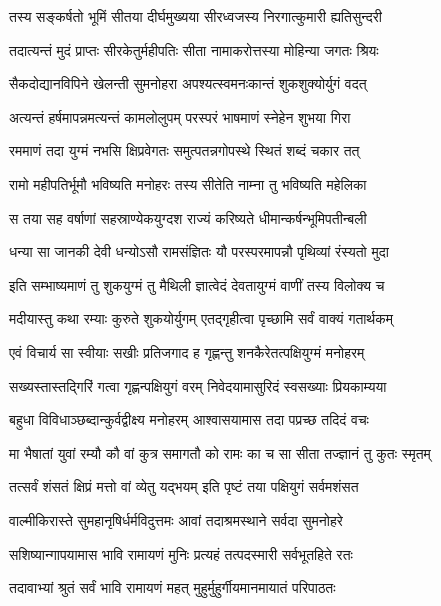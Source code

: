 \twolineshloka
{तस्य सङ्कर्षतो भूमिं सीतया दीर्घमुख्यया}
{सीरध्वजस्य निरगात्कुमारी ह्यतिसुन्दरी}%

\twolineshloka
{तदात्यन्तं मुदं प्राप्तः सीरकेतुर्महीपतिः}
{सीता नामाकरोत्तस्या मोहिन्या जगतः श्रियः}%

\twolineshloka
{सैकदोद्यानविपिने खेलन्ती सुमनोहरा}
{अपश्यत्स्वमनःकान्तं शुकशुक्योर्युगं वदत्}%

\twolineshloka
{अत्यन्तं हर्षमापन्नमत्यन्तं कामलोलुपम्}
{परस्परं भाषमाणं स्नेहेन शुभया गिरा}%

\twolineshloka
{रममाणं तदा युग्मं नभसि क्षिप्रवेगतः}
{समुत्पतन्नगोपस्थे स्थितं शब्दं चकार तत्}%

\twolineshloka
{रामो महीपतिर्भूमौ भविष्यति मनोहरः}
{तस्य सीतेति नाम्ना तु भविष्यति महेलिका}%

\twolineshloka
{स तया सह वर्षाणां सहस्राण्येकयुग्दश}
{राज्यं करिष्यते धीमान्कर्षन्भूमिपतीन्बली}%

\twolineshloka
{धन्या सा जानकी देवी धन्योऽसौ रामसंज्ञितः}
{यौ परस्परमापन्नौ पृथिव्यां रंस्यतो मुदा}%

\twolineshloka
{इति सम्भाष्यमाणं तु शुकयुग्मं तु मैथिली}
{ज्ञात्वेदं देवतायुग्मं वाणीं तस्य विलोक्य च}%

\twolineshloka
{मदीयास्तु कथा रम्याः कुरुते शुकयोर्युगम्}
{एतद्गृहीत्वा पृच्छामि सर्वं वाक्यं गतार्थकम्}%

\twolineshloka
{एवं विचार्य सा स्वीयाः सखीः प्रतिजगाद ह}
{गृह्णन्तु शनकैरेतत्पक्षियुग्मं मनोहरम्}%

\twolineshloka
{सख्यस्तास्तद्गिरिं गत्वा गृह्णन्पक्षियुगं वरम्}
{निवेदयामासुरिदं स्वसख्याः प्रियकाम्यया}%

\twolineshloka
{बहुधा विविधाञ्छब्दान्कुर्वद्वीक्ष्य मनोहरम्}
{आश्वासयामास तदा पप्रच्छ तदिदं वचः}%


\twolineshloka
{मा भैषातां युवां रम्यौ कौ वां कुत्र समागतौ}
{को रामः का च सा सीता तज्ज्ञानं तु कुतः स्मृतम्}%

\twolineshloka
{तत्सर्वं शंसतं क्षिप्रं मत्तो वां व्येतु यद्भयम्}
{इति पृष्टं तया पक्षियुगं सर्वमशंसत}%


\twolineshloka
{वाल्मीकिरास्ते सुमहानृषिर्धर्मविदुत्तमः}
{आवां तदाश्रमस्थाने सर्वदा सुमनोहरे}%

\twolineshloka
{सशिष्यान्गापयामास भावि रामायणं मुनिः}
{प्रत्यहं तत्पदस्मारी सर्वभूतहिते रतः}%

\twolineshloka
{तदावाभ्यां श्रुतं सर्वं भावि रामायणं महत्}
{मुहुर्मुहुर्गीयमानमायातं परिपाठतः}%

